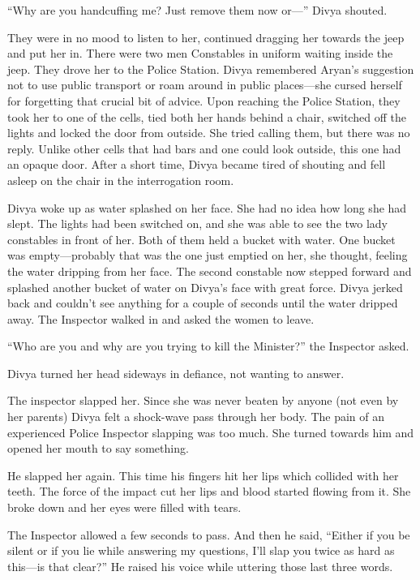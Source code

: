 “Why are you handcuffing me? Just remove them now or—” Divya shouted.

They were in no mood to listen to her, continued dragging her towards the jeep
and put her in. There were two men Constables in uniform waiting inside the
jeep. They drove her to the Police Station. Divya remembered Aryan's suggestion
not to use public transport or roam around in public places—she cursed herself
for forgetting that crucial bit of advice. Upon reaching the Police Station,
they took her to one of the cells, tied both her hands behind a chair, switched
off the lights and locked the door from outside. She tried calling them, but
there was no reply. Unlike other cells that had bars and one could look outside,
this one had an opaque door. After a short time, Divya became tired of shouting
and fell asleep on the chair in the interrogation room.

Divya woke up as water splashed on her face. She had no idea how long she had
slept. The lights had been switched on, and she was able to see the two lady
constables in front of her. Both of them held a bucket with water. One bucket
was empty—probably that was the one just emptied on her, she thought, feeling
the water dripping from her face. The second constable now stepped forward and
splashed another bucket of water on Divya's face with great force. Divya jerked
back and couldn't see anything for a couple of seconds until the water dripped
away. The Inspector walked in and asked the women to leave.

“Who are you and why are you trying to kill the Minister?” the Inspector asked.

Divya turned her head sideways in defiance, not wanting to answer.

The inspector slapped her. Since she was never beaten by anyone (not even by her
parents) Divya felt a shock-wave pass through her body. The pain of an
experienced Police Inspector slapping was too much. She turned towards him and
opened her mouth to say something.

He slapped her again. This time his fingers hit her lips which collided with her
teeth. The force of the impact cut her lips and blood started flowing from it.
She broke down and her eyes were filled with tears.

The Inspector allowed a few seconds to pass. And then he said, “Either if you be
silent or if you lie while answering my questions, I'll slap you twice as hard
as this—is that clear?” He raised his voice while uttering those last three
words.

